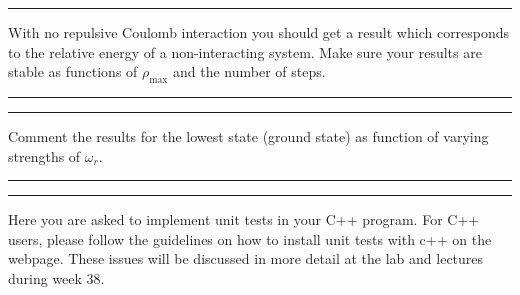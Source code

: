 \documentclass[11pt,a4wide]{article}
\begin{document}
\noindent\rule{\textwidth}{1pt}
With no repulsive Coulomb interaction 
you should get a result which corresponds to 
the relative energy of a non-interacting system.   
Make sure your results are 
stable as functions of $\rho_{\mathrm{max}}$ and the number of steps.
\noindent\rule{\textwidth}{1pt}

\noindent\rule{\textwidth}{1pt}
Comment the results for the lowest state (ground state) as function of
varying strengths of $\omega_r$. 
\noindent\rule{\textwidth}{1pt}




\noindent\rule{\textwidth}{1pt} 
Here you are asked to implement unit tests in your C++ program. For C++ users, please follow the guidelines on how to install unit tests with c++ on the webpage. These issues will be discussed in more detail at the lab and lectures during week 38. 
\end{document}
